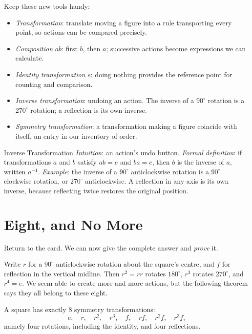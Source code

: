 \begin{toolbox}
Keep these new tools handy:
\begin{itemize}
  \item \emph{Transformation}: translate moving a figure into a rule transporting every point, so actions can be compared precisely.
  \item \emph{Composition} $ab$: first $b$, then $a$; successive actions become expressions we can calculate.
  \item \emph{Identity transformation} $e$: doing nothing provides the reference point for counting and comparison.
  \item \emph{Inverse transformation}: undoing an action. The inverse of a $90^\circ$ rotation is a $270^\circ$ rotation; a reflection is its own inverse.
  \item \emph{Symmetry transformation}: a transformation making a figure coincide with itself, an entry in our inventory of order.
\end{itemize}
\end{toolbox}

\begin{shuyu}{Inverse Transformation}
\emph{Intuition}: an action's undo button. \emph{Formal definition}: if transformations $a$ and $b$ satisfy $ab=e$ and $ba=e$, then $b$ is the inverse of $a$, written $a^{-1}$. \emph{Example}: the inverse of a $90^\circ$ anticlockwise rotation is a $90^\circ$ clockwise rotation, or $270^\circ$ anticlockwise. A reflection in any axis is its own inverse, because reflecting twice restores the original position.
\end{shuyu}

\section{Eight, and No More}

Return to the card. We can now give the complete answer and \emph{prove} it.

Write $r$ for a $90^\circ$ anticlockwise rotation about the square's centre, and $f$ for reflection in the vertical midline. Then $r^2=rr$ rotates $180^\circ$, $r^3$ rotates $270^\circ$, and $r^4=e$. We seem able to create more and more actions, but the following theorem says they all belong to these eight.

\begin{dingli}
A square has exactly $8$ symmetry transformations:
\[
e,\quad r,\quad r^2,\quad r^3,\quad f,\quad rf,\quad r^2f,\quad r^3f,
\]
namely four rotations, including the identity, and four reflections.
\end{dingli}

